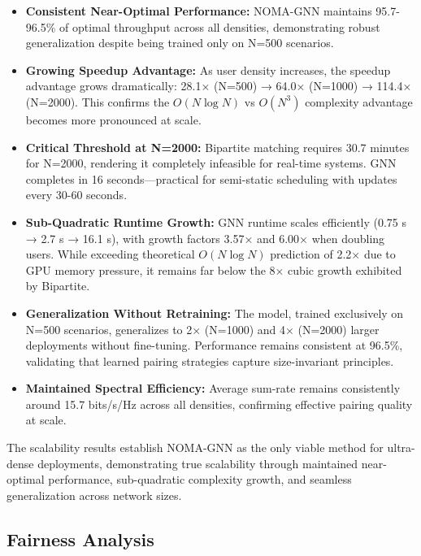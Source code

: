 \begin{itemize}
    \item \textbf{Consistent Near-Optimal Performance:} NOMA-GNN maintains 95.7-96.5\% of optimal throughput across all densities, demonstrating robust generalization despite being trained only on N=500 scenarios.
    
    \item \textbf{Growing Speedup Advantage:} As user density increases, the speedup advantage grows dramatically: 28.1× (N=500) → 64.0× (N=1000) → 114.4× (N=2000). This confirms the $O(N \log N)$ vs $O(N^3)$ complexity advantage becomes more pronounced at scale.
    
    \item \textbf{Critical Threshold at N=2000:} Bipartite matching requires 30.7 minutes for N=2000, rendering it completely infeasible for real-time systems. GNN completes in 16 seconds—practical for semi-static scheduling with updates every 30-60 seconds.
    
    \item \textbf{Sub-Quadratic Runtime Growth:} GNN runtime scales efficiently (0.75 s → 2.7 s → 16.1 s), with growth factors 3.57× and 6.00× when doubling users. While exceeding theoretical $O(N \log N)$ prediction of 2.2× due to GPU memory pressure, it remains far below the 8× cubic growth exhibited by Bipartite.
    
    \item \textbf{Generalization Without Retraining:} The model, trained exclusively on N=500 scenarios, generalizes to 2× (N=1000) and 4× (N=2000) larger deployments without fine-tuning. Performance remains consistent at 96.5\%, validating that learned pairing strategies capture size-invariant principles.
    
    \item \textbf{Maintained Spectral Efficiency:} Average sum-rate remains consistently around 15.7 bits/s/Hz across all densities, confirming effective pairing quality at scale.
\end{itemize}

The scalability results establish NOMA-GNN as the only viable method for ultra-dense deployments, demonstrating true scalability through maintained near-optimal performance, sub-quadratic complexity growth, and seamless generalization across network sizes.

\subsection{Fairness Analysis}

